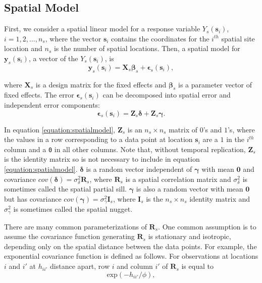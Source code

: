\documentclass[]{interact}
\theoremstyle{plain}%
\theoremstyle{definition}
\theoremstyle{remark}
\begin{document}
\subsection{Spatial Model} \label{subsection:spatialmodel}

First, we consider a spatial linear model for a response variable
\(Y_s(\mathbf{s}_{i})\), \(i = 1, 2, \ldots, n_{s}\), where the vector
\(\mathbf{s}_i\) contains the coordinates for the \(i^{th}\) spatial
site location and \(n_s\) is the number of spatial locations. Then, a
spatial model for \(\mathbf{y}_s(\mathbf{s}_{i})\), a vector of the
\(Y_s(\mathbf{s}_{i})\), is \mbox{} \begin{equation}
\mathbf{y}_s(\mathbf{s}_{i}) = \mathbf{X}_s \bm{\beta}_s + \bm{\epsilon}_s(\mathbf{s}_{i}),
\end{equation}

\noindent where \(\mathbf{X}_s\) is a design matrix for the fixed
effects and \(\bm{\beta}_s\) is a parameter vector of fixed effects. The
error \(\bm{\epsilon}_s(\mathbf{s}_{i})\) can be decomposed into spatial
error and independent error components: \mbox{} \begin{equation}
\label{equation:spatialmodel}
\bm{\epsilon}_s(\mathbf{s}_{i}) = \mathbf{Z}_{s} \bm{\delta} + \mathbf{Z}_{s} \bm{\gamma}.
\end{equation}

\noindent In equation \ref{equation:spatialmodel}, \(\mathbf{Z}_{s}\) is
an \(n_s \times n_s\) matrix of \(0\)'s and \(1\)'s, where the values in
a row corresponding to a data point at location \(\mathbf{s}_{i}\) are a
\(1\) in the \(i^{th}\) column and a \texttt{0} in all other columns.
Note that, without temporal replication, \(\mathbf{Z}_s\) is the
identity matrix so is not necessary to include in equation
\ref{equation:spatialmodel}. \(\bm{\delta}\) is a random vector
independent of \(\bm{\gamma}\) with mean \(\mathbf{0}\) and covariance
\(cov(\bm{\delta}) = \sigma^2_{\delta} \mathbf{R}_{s}\), where
\(\mathbf{R}_s\) is a spatial correlation matrix and
\(\sigma^2_{\delta}\) is sometimes called the spatial partial sill.
\(\bm{\gamma}\) is also a random vector with mean \(\mathbf{0}\) but has
covariance \(cov(\bm{\gamma}) = \sigma^2_{\gamma} \mathbf{I}_{s}\),
where \(\mathbf{I}_s\) is the \(n_s \times n_s\) identity matrix and
\(\sigma^2_{\gamma}\) is sometimes called the spatial nugget.

There are many common parameterizations of \(\mathbf{R}_{s}\). One
common assumption is to assume the covariance function generating
\(\mathbf{R}_s\) is stationary and isotropic, depending only on the
spatial distance between the data points. For example, the exponential
covariance function is defined as follows. For observations at locations
\(i\) and \(i'\) at \(h_{ii'}\) distance apart, row \(i\) and column
\(i'\) of \(\mathbf{R}_{s}\) is equal to \mbox{} \begin{equation}
\label{equation:spatcov}
\text{exp}(-h_{ii'} / \phi),
\end{equation}
\end{document}
